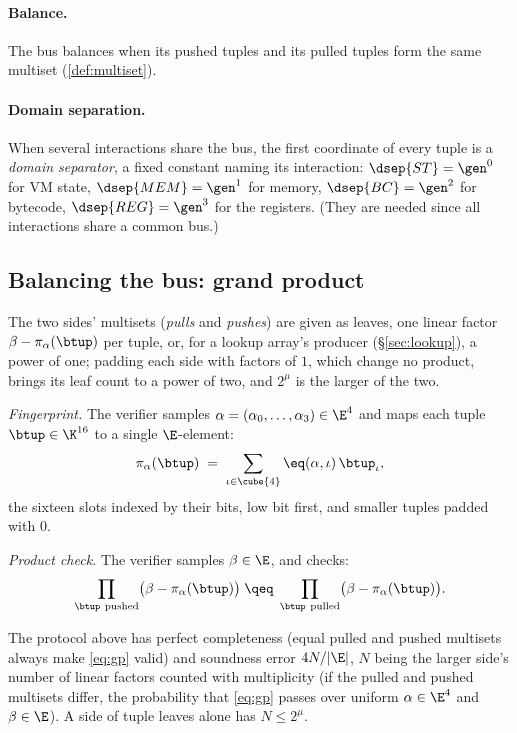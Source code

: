 \paragraph{Balance.} The bus balances when its pushed tuples and its pulled tuples form the same multiset (\ref{def:multiset}).

\paragraph{Domain separation.} When several interactions share the bus, the first coordinate of every tuple is a \emph{domain separator}, a fixed constant naming its interaction: $\dsep{ST}=\gen^{0}$ for VM state, $\dsep{MEM}=\gen^{1}$ for memory, $\dsep{BC}=\gen^{2}$ for bytecode, $\dsep{REG}=\gen^{3}$ for the registers. (They are needed since all interactions share a common bus.)

\subsection{Balancing the bus: grand product}\label{sec:gp}

The two sides' multisets (\emph{pulls} and \emph{pushes}) are given as leaves, one linear factor $\beta-\pi_\alpha(\btup)$ per tuple, or, for a lookup array's producer (\S\ref{sec:lookup}), a power of one; padding each side with factors of $1$, which change no product, brings its leaf count to a power of two, and $2^{\mu}$ is the larger of the two.

\emph{Fingerprint.} The verifier samples $\alpha=(\alpha_0,\dots,\alpha_3)\in\E^{4}$ and maps each tuple $\btup \in \K^{16}$ to a single $\E$-element:
\[
\pi_\alpha(\btup)\;=\;\sum_{\iota\in\cube{4}}\eq(\alpha,\iota)\,\btup_\iota ,
\]
the sixteen slots indexed by their bits, low bit first, and smaller tuples padded with $0$.

\emph{Product check.} The verifier samples $\beta\in\E$, and checks:
\begin{equation}
\prod_{\btup\ \text{pushed}}\bigl(\beta-\pi_\alpha(\btup)\bigr)
\;\qeq\;
\prod_{\btup\ \text{pulled}}\bigl(\beta-\pi_\alpha(\btup)\bigr).
\label{eq:gp}
\end{equation}

\begin{theorem}\label{th:product_check}
  The protocol above has perfect completeness (equal pulled and pushed multisets always make \eqref{eq:gp} valid) and soundness error $4N/|\E|$, $N$ being the larger side's number of linear factors counted with multiplicity (if the pulled and pushed multisets differ, the probability that \eqref{eq:gp} passes over uniform $\alpha \in \E^{4}$ and $\beta \in \E$). A side of tuple leaves alone has $N\le2^{\mu}$.
\end{theorem}


